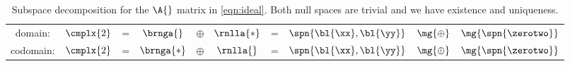 {\small{
\begin{table}[h!]
	\begin{center}
		\begin{tabular}{cccccccccc}
		  domain: & $\cmplx{2}$ & = & $\brnga{}$ & $\oplus$ & $\rnlla{*}$ & = & $\spn{\bl{\xx},\bl{\yy}}$ & $\mg{\oplus}$ & $\mg{\spn{\zerotwo}}$ \\[12pt]
		  codomain: & $\cmplx{2}$ & = & $\brnga{*}$ & $\oplus$ & $\rnlla{}$ & = & $\spn{\bl{\xx},\bl{\yy}}$ & $\mg{\oplus}$ & $\mg{\spn{\zerotwo}}$ \\[10pt] 
		\end{tabular}
	\end{center}
	\caption[Subspace decomposition for the $\A{}$ matrix in \eqref{eqn:ideal}]{Subspace decomposition for the $\A{}$ matrix in \eqref{eqn:ideal}. Both null spaces are trivial and we have existence and uniqueness.}
\end{table}
}}

\endinput  %